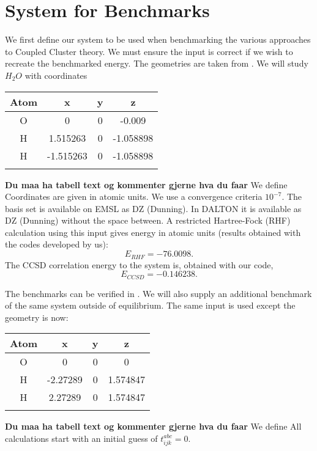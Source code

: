 \section{System for Benchmarks}
We first define our system to be used when benchmarking the various
approaches to Coupled Cluster theory. We must ensure the input is
correct if we wish to recreate the benchmarked energy. The geometries
are taken from \cite{CCSDT-ref10}. We will study $H_2O$ with
coordinates \\
\begin{center}
  \begin{tabular}{ c c c c }
  \hline
     Atom & x & y & z \\ \hline
     O & 0 & 0 & -0.009 \\
     H & 1.515263 & 0 & -1.058898 \\
     H & -1.515263 & 0 & -1.058898 \\
     \hline \\
  \end{tabular} 
\end{center} 
{\bf Du maa ha tabell text og kommenter gjerne hva du faar} We define
Coordinates are given in atomic units. We use a convergence criteria
$10^{-7}$. The basis set is available on EMSL as DZ (Dunning). In
DALTON it is available as DZ (Dunning) without the space between. A restricted Hartree-Fock (RHF)
calculation using this input gives energy in atomic units (results obtained with the codes developed by us):
\begin{equation}
E_{RHF} = -76.0098 .
\end{equation}
The CCSD correlation energy to the system is, obtained with our code, 
\begin{equation}
E_{CCSD} = -0.146238 .
\end{equation}

The benchmarks can be verified in \cite{CCSDT-ref3}. We will also
supply an additional benchmark of the same system outside of
equilibrium. The same input is used except the geometry is now: \\
\begin{center}
  \begin{tabular}{ c c c c }
  \hline
     Atom & x & y & z \\ \hline
     O & 0 & 0 & 0 \\
     H & -2.27289   & 0 & 1.574847 \\
     H & 2.27289 & 0 & 1.574847 \\
     \hline \\
  \end{tabular} 
\end{center} 
{\bf Du maa ha tabell text og kommenter gjerne hva du faar} We define
All calculations start with an initial guess of $t_{ijk}^{abc} = 0$.


